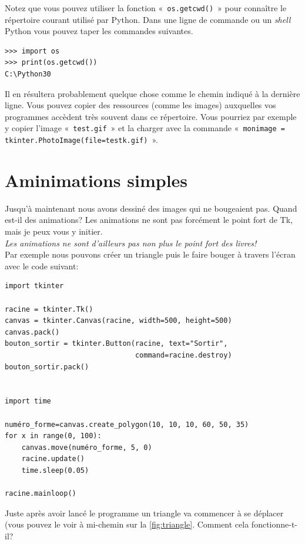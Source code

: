 Notez que vous pouvez utiliser la fonction « \texttt{os.getcwd()} » pour connaître le répertoire courant utilisé par Python. Dans une ligne de commande ou un \emph{shell} Python vous pouvez taper les commandes suivantes.
\begin{Verbatim}[frame=single,rulecolor=\color{mbleu}, label=à taper]
>>> import os 
>>> print(os.getcwd())
C:\Python30
\end{Verbatim}

Il en résultera probablement quelque chose comme le chemin indiqué à la dernière ligne. Vous pouvez copier des ressources (comme les images) auxquelles vos programmes accèdent très souvent dans ce répertoire. Vous pourriez par exemple y copier l'image « \texttt{test.gif} » et la charger avec la commande « \texttt{monimage = tkinter.PhotoImage(file=testk.gif)} ».

\section{Aminimations simples}
Jusqu'à maintenant nous avons dessiné des images qui ne bougeaient pas. Quand est-il des animations?
Les animations ne sont pas forcément le point fort de Tk, mais je peux vous y initier.\\

\emph{Les animations ne sont d'ailleurs pas non plus le point fort des livres!}\\

Par exemple nous pouvons créer un triangle puis le faire bouger à travers l'écran avec le code suivant:
\begin{Verbatim}[frame=single,rulecolor=\color{mbleu}, label=à taper]
import tkinter

racine = tkinter.Tk()
canvas = tkinter.Canvas(racine, width=500, height=500)
canvas.pack()
bouton_sortir = tkinter.Button(racine, text="Sortir",
                               command=racine.destroy)
bouton_sortir.pack()


import time

numéro_forme=canvas.create_polygon(10, 10, 10, 60, 50, 35)
for x in range(0, 100):
    canvas.move(numéro_forme, 5, 0)
    racine.update()
    time.sleep(0.05)

racine.mainloop()
\end{Verbatim}

Juste après avoir lancé le programme un triangle va commencer à se déplacer (vous pouvez le voir à mi-chemin sur la \autoref{fig:triangle}. Comment cela fonctionne-t-il?

